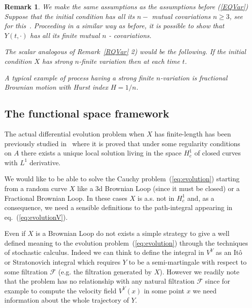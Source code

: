 \documentclass[a4paper,12pt,reqno]{amsart}
\newtheorem{remark}{Remark}
\begin{document}
\begin{remark}\label{Ncov}
We make the same assumptions as  the assumptions before (\ref{EQVar})
Suppose that  the initial condition  has all its $n-$ mutual covariations
 $n\ge 3$, see for this~\cite{er}.
Proceeding in a similar way as before, it is possible to show 
that $Y(t, \cdot)$ has all its finite mutual $n$ - covariations.

The scalar analogous of Remark~\ref{RQVar} 2)
 would be the following. If the initial condition $X$ has 
strong $n$-finite variation then at each time $t$.

A typical example of process having a strong finite 
$n$-variation is fractional Brownian motion with Hurst
index $H= 1/n$.
\end{remark}


\subsection{The functional space framework}

The actual differential evolution  problem when $X$ has finite-length has been previously studied
in~\cite{BerselliBessaih} where it is proved that under some regularity conditions
on $A$ there exists a unique local solution living in the space $H^1_c$ of
closed curves with $L^1$ derivative. 

We would like to be able to solve the Cauchy
problem~(\ref{eq:evolution}) starting from a  random curve $X$ like a
3d Brownian Loop (since it must be closed) or a Fractional Brownian
Loop. In these cases $X$ is a.s. not in $H^1_c$ and, as a consequence, we need
 a sensible definitions to the path-integral appearing in
eq.~(\ref{eq:evolutionV}). 

 
Even if $X$ is a Brownian Loop do not exists a simple strategy to give
a well defined meaning to the evolution problem~(\ref{eq:evolution})
through the techniques of stochastic calculus. Indeed we can think to
define the integral in $V^Y$ as an It\^o or Stratonovich integral
which requires $Y$ to be a semi-martingale with respect to some
filtration $\mathcal{F}$ (e.g. the filtration generated by $X$). However we readily note that the problem has
no relationship with any natural filtration $\mathcal{F}$ since for example to
compute the velocity field $V^Y(x)$ in some point $x$ we need information about the whole trajectory of $Y$. 
\end{document}
